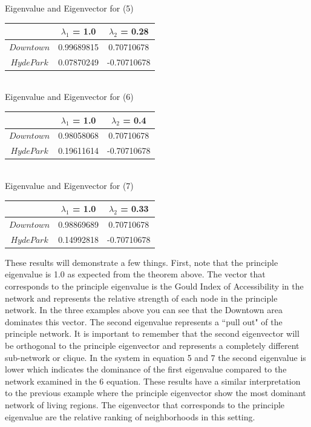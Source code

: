 \documentclass{article}
\theoremstyle{definition}
\theoremstyle{remark}
\begin{document}
\begin{center}
Eigenvalue and Eigenvector for (5) \\
\begin{tabular}{||c | c c ||} 
 \hline
 & $\lambda_1$ = 1.0 & $\lambda_2$ = 0.28\\[0.5ex] 
 \hline\hline
 $Downtown$ & 0.99689815 & 0.70710678\\
 $Hyde Park$ & 0.07870249 & -0.70710678  \\ 
 \hline
 \end{tabular} \\ 
 
Eigenvalue and Eigenvector for (6) \\
\begin{tabular}{||c | c c ||} 
 \hline
 & $\lambda_1$ = 1.0 & $\lambda_2$ = 0.4\\[0.5ex] 
 \hline\hline
 $Downtown$ & 0.98058068 & 0.70710678 \\
 $Hyde Park$ & 0.19611614 & -0.70710678  \\ 
 \hline
 \end{tabular} \\ 
 
Eigenvalue and Eigenvector for (7) \\
\begin{tabular}{||c | c c ||} 
 \hline
 & $\lambda_1$ = 1.0 & $\lambda_2$ = 0.33\\[0.5ex] 
 \hline\hline
 $Downtown$ & 0.98869689 & 0.70710678 \\
 $Hyde Park$ & 0.14992818 & -0.70710678  \\ 
 \hline
 \end{tabular}
 \end{center}

These results will demonstrate a few things.  First, note that the principle eigenvalue is 1.0 as expected from the theorem above.  The vector that corresponds to the principle eigenvalue is the Gould Index of Accessibility in the network and represents the relative strength of each node in the principle network.  In the three examples above you can see that the Downtown area dominates this vector.  The second eigenvalue represents a ``pull out" of the principle network.  It is important to remember that the second eigenvector will be orthogonal to the principle eigenvector and represents a completely different sub-network or clique.  In the system in equation 5 and 7 the second eigenvalue is lower which indicates the dominance of the first eigenvalue compared to the network examined in the 6 equation.  These results have a similar interpretation to the previous example where the principle eigenvector show the most dominant network of living regions.  The eigenvector that corresponds to the principle eigenvalue are the relative ranking of neighborhoods in this setting.  \\
\end{document}
